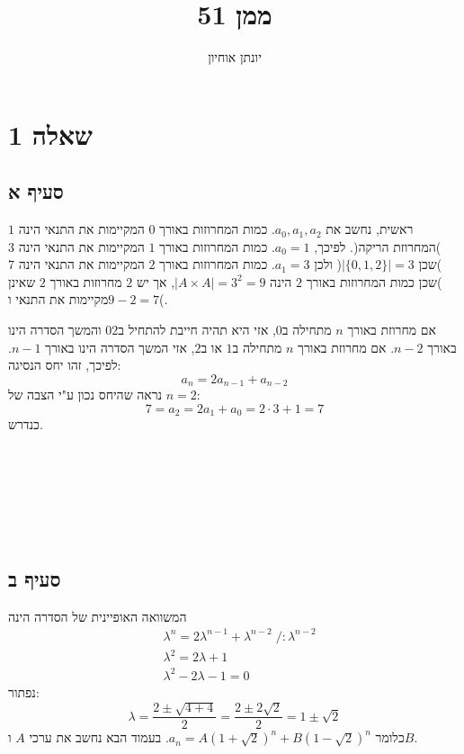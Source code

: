 \documentclass[11pt, oneside]{article}
\title{ממן 51}
\author{יונתן אוחיון}
\newcommand{\qed}{\R{$\blacksquare$}}
\newcommand{\br}{\\\\\\\\\\\\\\}
\begin{document}
\maketitle

\section{שאלה 1}
\subsection{סעיף א}
ראשית, נחשב את $a_0, a_1, a_2$.
כמות המחרוזות באורך $0$ המקיימות את התנאי הינה $1$ )המחרוזת הריקה(. לפיכך, $a_0 = 1$.
כמות המחרוזות באורך $1$ המקיימות את התנאי הינה $3$ )שכן $|\{0, 1, 2\}| = 3$( ולכן $a_1 = 3$.
כמות המחרוזות באורך $2$ המקיימות את התנאי הינה $7$ )שכן כמות המחרוזות באורך $2$ הינה $|A \times A| = 3^2 = 9$, אך יש $2$ מחרוזות באורך $2$ שאינן מקיימות את התנאי ו$9 - 2 = 7$(.

אם מחרוזת באורך $n$ מתחילה ב$0$, אזי היא תהיה חייבת להתחיל ב$02$ והמשך הסדרה הינו באורך $n - 2$.
אם מחרוזת באורך $n$ מתחילה ב$1$ או ב$2$, אזי המשך הסדרה הינו באורך $n - 1$.
לפיכך, זהו יחס הנסיגה:
\[
a_n = 2a_{n - 1} + a_{n - 2}
\]
נראה שהיחס נכון ע"י הצבה של $n = 2$:
\[
7 = a_2 = 2a_1 + a_0 = 2 \cdot 3 + 1 = 7
\]
כנדרש.
\br\qed

\subsection{סעיף ב}
המשוואה האופיינית של הסדרה הינה
\begin{align*}
& \lambda^n = 2\lambda^{n-1} + \lambda^{n-2}\;/:\lambda^{n-2}\\
& \lambda^2 = 2\lambda + 1\\
& \lambda^2 - 2\lambda - 1 = 0
\end{align*}
נפתור:
\[
\lambda = \frac{2 \pm \sqrt{4 + 4}}{2} = \frac{2 \pm 2\sqrt{2}}{2} = 1 \pm \sqrt{2}
\]
כלומר $a_n = A(1 + \sqrt{2})^n + B(1 - \sqrt{2})^n$. בעמוד הבא נחשב את ערכי $A$ ו$B$.
\clearpage

\setcounter{subsection}{0}
\end{document}
